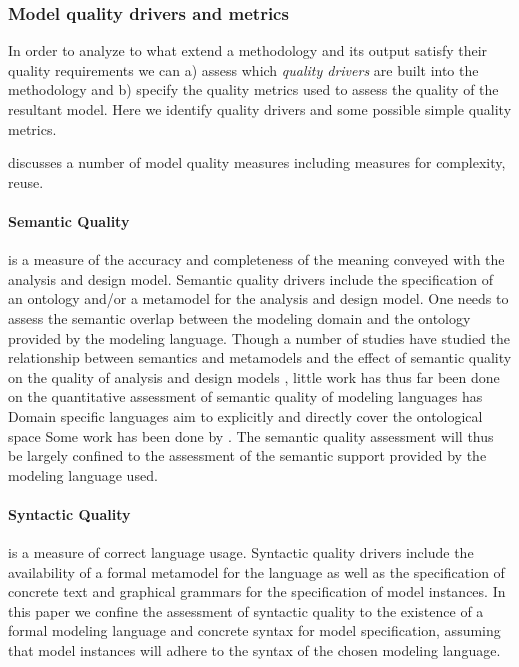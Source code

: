 
\subsubsection{Model quality drivers and metrics}

In order to analyze to what extend a methodology and its output satisfy their quality requirements we can a) assess which \emph{quality drivers} are built into the methodology and b) specify the quality metrics used to assess the quality of the resultant model. Here we identify quality drivers and some possible simple quality metrics.

\cite{mohagheghi_existing_2009} discusses a number of model quality measures including measures for complexity, reuse.


\paragraph{Semantic Quality} is a measure of the accuracy and completeness of the meaning conveyed with the analysis and design model. Semantic quality drivers include the specification of an ontology and/or a metamodel for the analysis and design model. One needs to assess the semantic overlap between the modeling domain and the ontology provided by the modeling language. Though a number of studies have studied the relationship between semantics and metamodels \cite{staab_model_2010,veldhuis_tool_2009,henderson-sellers_bridging_2011,} and the effect of semantic quality on the quality of analysis and design models \cite{buder_effects_2010,staab_model_2010}, little work has thus far been done on the quantitative assessment of semantic quality of modeling languages has Domain specific languages aim to explicitly and directly cover the ontological space Some work has been done by \cite{gall_semantic_2008}. The semantic quality assessment will thus be largely confined to the assessment of the semantic support provided by the modeling language used.

\paragraph{Syntactic Quality} is a measure of correct language usage. Syntactic quality drivers include the availability of a formal metamodel for the language as well as the specification of concrete text and graphical grammars for the specification of model instances. In this paper we confine the assessment of syntactic quality to the existence of a formal modeling language and concrete syntax for model specification, assuming that model instances will adhere to the syntax of the chosen modeling language.

